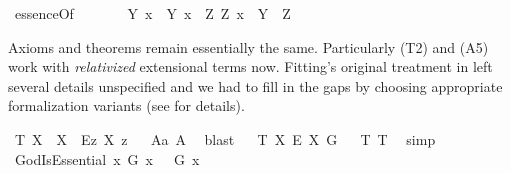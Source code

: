 \begin{isabellebody}
\isamarkupfalse%
\ essenceOf{\isacharcolon}{\isacharcolon}{\isachardoublequoteopen}{\isasymup}{\isasymlangle}{\isasymlangle}{\isasymzero}{\isasymrangle}{\isacharcomma}{\isasymzero}{\isasymrangle}{\isachardoublequoteclose}\ {\isacharparenleft}{\isachardoublequoteopen}{\isasymE}{\isachardoublequoteclose}{\isacharparenright}\ \isanewline
\ \ \ \ {\isachardoublequoteopen}{\isasymE}\ Y\ x\ {\isasymequiv}\ {\isasymlparr}Y\ x{\isasymrparr}\ \isactrlbold {\isasymand}\ {\isacharparenleft}\isactrlbold {\isasymforall}Z{\isacharcolon}{\isacharcolon}{\isasymlangle}{\isasymzero}{\isasymrangle}{\isachardot}\ {\isasymlparr}Z\ x{\isasymrparr}\ \isactrlbold {\isasymrightarrow}\ Y\ {\isasymRrightarrow}\ Z{\isacharparenright}{\isachardoublequoteclose}%
%
%
%
%
%
%
%
%
%
%
%
%
%
%
%
%
%
%
\begin{isamarkuptext}%
Axioms and theorems remain essentially the same. Particularly (T2)  and (A5) 
work with \emph{relativized} extensional terms now. Fitting's original treatment in \cite{Fitting} left several
details unspecified and we had to fill in the gaps by choosing appropriate formalization variants (see \cite{J35} for details).%
\end{isamarkuptext}\isamarkuptrue%
\isamarkupfalse%
\ T{}{\isacharcolon}\ {\isachardoublequoteopen}{\isasymlfloor}\isactrlbold {\isasymforall}X{\isacharcolon}{\isacharcolon}{\isasymlangle}{\isasymzero}{\isasymrangle}{\isachardot}\ {\isasymP}\ X\ \isactrlbold {\isasymrightarrow}\ \isactrlbold {\isasymdiamond}{\isacharparenleft}\isactrlbold {\isasymexists}\isactrlsup Ez{\isachardot}\ {\isasymlparr}X\ z{\isasymrparr}{\isacharparenright}{\isasymrfloor}{\isachardoublequoteclose}%
\ %
%
\isamarkupfalse%
\ A{}a\ A{}\ \isamarkupfalse%
\ blast%
%
%
\ \isanewline
{}\isamarkupfalse%
\ T{}{\isacharcolon}\ {\isachardoublequoteopen}{\isasymlfloor}{\isacharparenleft}{\isasymlambda}X{\isachardot}\ \isactrlbold {\isasymdiamond}\isactrlbold {\isasymexists}\isactrlsup E\ X{\isacharparenright}\ \isactrlbold {\isasymdown}G{\isasymrfloor}{\isachardoublequoteclose}%
\ %
%
\isamarkupfalse%
\ T{}\ T{}\ \isamarkupfalse%
\ simp\ %
%
%
%
\ \isanewline
{}\isamarkupfalse%
\ GodIsEssential{\isacharcolon}\ {\isachardoublequoteopen}{\isasymlfloor}\isactrlbold {\isasymforall}x{\isachardot}\ G\ x\ \isactrlbold {\isasymrightarrow}\ {\isacharparenleft}{\isacharparenleft}{\isasymE}\ {\isasymdown}G{\isacharparenright}\ x{\isacharparenright}{\isasymrfloor}{\isachardoublequoteclose}%

\end{isabellebody}

